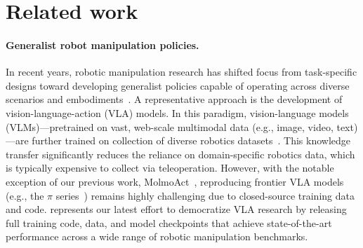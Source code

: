 \section{Related work}
\label{sec:related}



\paragraph{Generalist robot manipulation policies.}
In recent years, robotic manipulation research has shifted focus from task-specific designs toward developing generalist policies capable of operating across diverse scenarios and embodiments~\citep{berscheid2019robot,brohan2022rt,dasari2019robonet,ebert2021bridge,fang2023rh20t,jang2022bc,khazatsky2024droid,mandlekar2018roboturk,walke2023bridgedata,shafiullah2023bringing}.
A representative approach is the development of vision-language-action (VLA) models.
In this paradigm, vision-language models (VLMs)---pretrained on vast, web-scale multimodal data (e.g., image, video, text)---are further trained on collection of diverse robotics datasets~\citep{black2410pi0, brohan2022rt,zheng2024tracevla,zhao2025cot,team2025gemini,li2024cogact,qu2025spatialvla,kim2024openvla}.
This knowledge transfer significantly reduces the reliance on domain-specific robotics data, which is typically expensive to collect via teleoperation.
However, with the notable exception of our previous work, MolmoAct~\citep{lee2025molmoactactionreasoningmodels}, reproducing frontier VLA models (e.g., the $\pi$ series~\citep{black2410pi0,intelligence2025pi05visionlanguageactionmodelopenworld})
remains highly challenging due to closed-source training data and code.
\molmoact{} represents our latest effort to democratize VLA research by releasing full training code, data, and model checkpoints that achieve state-of-the-art performance across a wide range of robotic manipulation benchmarks.

